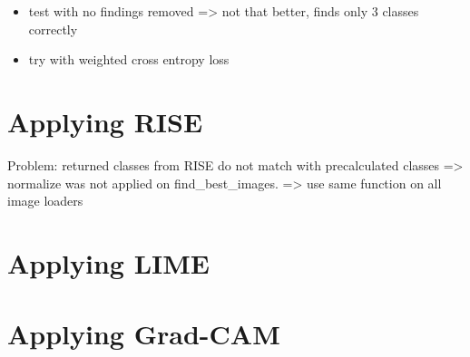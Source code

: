\begin{itemize}
    \item test with no findings removed => not that better, finds only 3 classes correctly
    \item try with weighted cross entropy loss
\end{itemize}



\section{Applying RISE}
Problem: returned classes from RISE do not match with precalculated classes
=> normalize was not applied on find\_best\_images.
=> use same function on all image loaders

\section{Applying LIME}
\section{Applying Grad-CAM}
